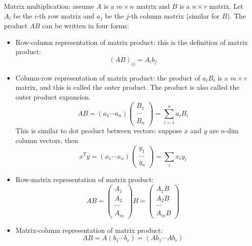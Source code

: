 \documentclass{report}
\begin{document}
Matrix multiplication: assume $A$ is a $m \times n$ matrix and $B$ is a $n \times r$ matrix. Let $A_i$ be the $i$-th row matrix and $a_j$ be the $j$-th column matrix (similar for $B$). The product $AB$ can be written in four forms:
\begin{itemize}
\item Row-column representation of matrix product: this is the definition of matrix product: 
\begin{equation}
(AB)_{ij} = A_i b_j	
\end{equation}

\item Column-row representation of matrix product: the product of $a_i B_i$ is a $m \times r$ matrix, and this is called the outer product. The product is also called the outer product expansion. 
\begin{equation}
AB = (a_1 \cdots a_n) \left( \begin{array}{c} B_1\\ \cdots \\ B_n \end{array} \right) = \sum_{i=1}^n a_i B_i
\label{eq:dotproduct_matrix}
\end{equation}
This is similar to dot product between vectors: suppose $x$ and $y$ are $n$-dim column vectors, then 
\begin{equation}
x^T y = (x_1 \cdots x_n) \left( \begin{array}{c} y_1\\ \cdots \\ y_n \end{array} \right)	= \sum_i x_i y_i
\end{equation}

\item Row-matrix representation of matrix product:
\begin{equation}
AB = 	\left( \begin{array}{c} A_1 \\ A_2 \\ \cdots \\ A_m \end{array} \right) B = \left( \begin{array}{c} A_1B \\ A_2B \\ \cdots \\ A_mB \end{array} \right)
\end{equation}

\item Matrix-column representation of matrix product:
\begin{equation}
AB = A (b_1 \cdots b_r) = (Ab_1 \cdots Ab_r)
\end{equation}


\end{itemize}
\end{document}
